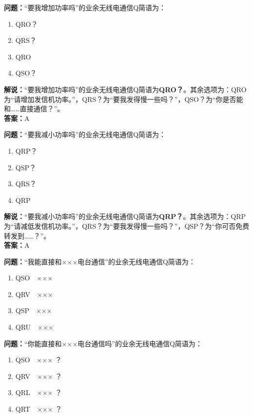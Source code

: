 \bigskip


\noindent\textbf{问题：}“要我增加功率吗”的业余无线电通信Q简语为：
\begin{enumerate}[label=\Alph*), leftmargin=3em]
\item QRO？
\item QRS？
\item QRO
\item QSO？
\end{enumerate}
\noindent\textbf{解说：}“要我增加功率吗”的业余无线电通信Q简语为\textbf{QRO？}。其余选项为：QRO为“请增加发信机功率。”，QRS？为“要我发得慢一些吗？”，QSO？为“你是否能和……直接通信？”。\\\noindent\textbf{答案：}A


\bigskip


\noindent\textbf{问题：}“要我减小功率吗”的业余无线电通信Q简语为：
\begin{enumerate}[label=\Alph*), leftmargin=3em]
\item QRP？
\item QSP？
\item QRS？
\item QRP
\end{enumerate}
\noindent\textbf{解说：}“要我减小功率吗”的业余无线电通信Q简语为\textbf{QRP？}。其余选项为：QRP为“请减低发信机功率。”，QRS？为“要我发得慢一些吗？”，QSP？为“你可否免费转发到……？”。\\\noindent\textbf{答案：}A


\bigskip


\noindent\textbf{问题：}“我能直接和×××电台通信”的业余无线电通信Q简语为：
\begin{enumerate}[label=\Alph*), leftmargin=3em]
\item QSO　×××
\item QRV　×××
\item QSP　×××
\item QRU　×××
\end{enumerate}

\bigskip


\noindent\textbf{问题：}“你能直接和×××电台通信吗”的业余无线电通信Q简语为：
\begin{enumerate}[label=\Alph*), leftmargin=3em]
\item QSO　××× ？
\item QRV　××× ？
\item QRL　××× ？
\item QRT　××× ？
\end{enumerate}

\bigskip


